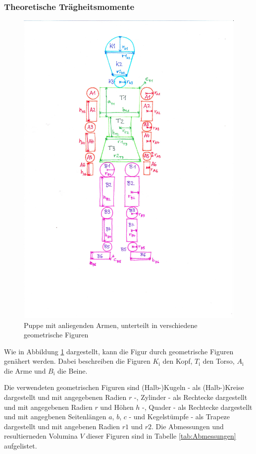   \subsubsection{Theoretische Trägheitsmomente}

  \begin{figure}
    \centering
    \includegraphics[scale=0.8]{content/Igor.pdf}
    \caption{Puppe mit anliegenden Armen, unterteilt in verschiedene
    geometrische Figuren}
    \label{fig:Igor}
  \end{figure}

  Wie in Abbildung \ref{fig:Igor} dargestellt, kann die Figur durch geometrische Figuren
  genähert werden. Dabei beschreiben die Figuren $K_\text{i}$ den Kopf, $T_\text{i}$ 
  den Torso, $A_\text{i}$ die Arme und $B_\text{i}$ die Beine.
  
  Die verwendeten geometrischen Figuren sind 
  (Halb-)Kugeln - als (Halb-)Kreise dargestellt und mit angegebenen Radien $r$ -, 
  Zylinder - als Rechtecke dargestellt und mit angegebenen Radien $r$ und Höhen $h$ -, 
  Quader - als Rechtecke dargestellt und mit angegbenen Seitenlängen $a$, $b$, $c$ -
  und Kegelstümpfe - als Trapeze dargestellt und mit angebenen Radien $r1$ und $r2$. 
  Die Abmessungen und resultierneden Volumina $V$ dieser Figuren sind in Tabelle
  \ref{tab:Abmessungen} aufgelistet. \\

